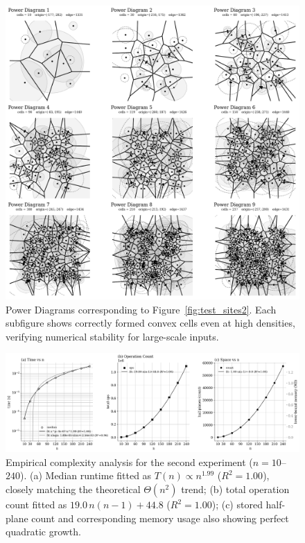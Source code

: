 \documentclass{article}
\begin{document}
\begin{figure}[H]
    \centering
    \includegraphics[width=0.95\linewidth]{Pictures/test_pd2.png}
    \caption{Power Diagrams corresponding to Figure~\ref{fig:test_sites2}. 
    Each subfigure shows correctly formed convex cells even at high densities, verifying numerical stability for large-scale inputs.}
    \label{fig:test_pd2}
\end{figure}

\begin{figure}[H]
    \centering
    \includegraphics[width=0.95\linewidth]{Pictures/power_complexity2.png}
    \caption{Empirical complexity analysis for the second experiment ($n=10$–$240$). 
    (a) Median runtime fitted as $T(n)\propto n^{1.99}$ ($R^2=1.00$), closely matching the theoretical $\Theta(n^2)$ trend; 
    (b) total operation count fitted as $19.0\,n(n-1)+44.8$ ($R^2=1.00$); 
    (c) stored half-plane count and corresponding memory usage also showing perfect quadratic growth.}
    \label{fig:power_complexity2}
\end{figure}
\end{document}
